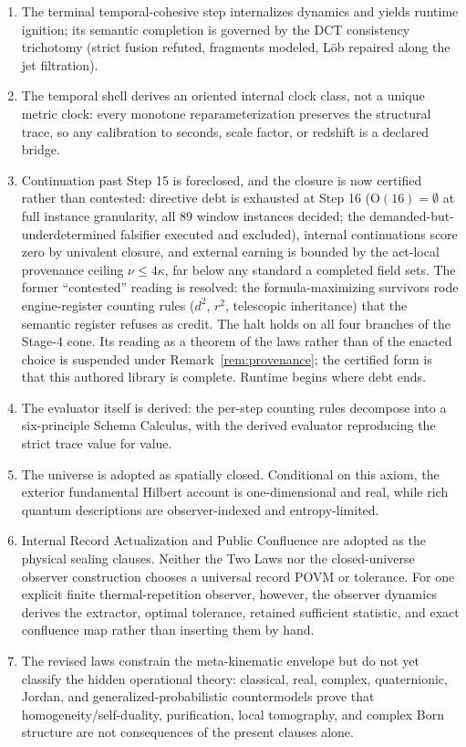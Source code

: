 \documentclass[11pt]{article}
\theoremstyle{plain}
\theoremstyle{definition}
\theoremstyle{remark}
\begin{document}
\begin{enumerate}[leftmargin=*]
\item The terminal temporal-cohesive step internalizes dynamics and yields runtime ignition; its semantic completion is governed by the DCT consistency trichotomy (strict fusion refuted, fragments modeled, L\"ob repaired along the jet filtration).
\item The temporal shell derives an oriented internal clock class, not a unique metric clock: every monotone reparameterization preserves the structural trace, so any calibration to seconds, scale factor, or redshift is a declared bridge.
\item Continuation past Step 15 is foreclosed, and the closure is now certified rather than contested: directive debt is exhausted at Step 16 (\(\mathrm{O}(16)=\emptyset\) at full instance granularity, all 89 window instances decided; the demanded-but-underdetermined falsifier executed and excluded), internal continuations score zero by univalent closure, and external earning is bounded by the act-local provenance ceiling \(\nu\le4\kappa\), far below any standard a completed field sets. The former ``contested'' reading is resolved: the formula-maximizing survivors rode engine-register counting rules (\(d^2\), \(r^2\), telescopic inheritance) that the semantic register refuses as credit. The halt holds on all four branches of the Stage-4 cone. Its reading as a theorem of the laws rather than of the enacted choice is suspended under Remark~\ref{rem:provenance}; the certified form is that this authored library is complete. Runtime begins where debt ends.
\item The evaluator itself is derived: the per-step counting rules decompose into a six-principle Schema Calculus, with the derived evaluator reproducing the strict trace value for value.
\item The universe is adopted as spatially closed. Conditional on this axiom, the exterior fundamental Hilbert account is one-dimensional and real, while rich quantum descriptions are observer-indexed and entropy-limited.
\item Internal Record Actualization and Public Confluence are adopted as the physical sealing clauses. Neither the Two Laws nor the closed-universe observer construction chooses a universal record POVM or tolerance. For one explicit finite thermal-repetition observer, however, the observer dynamics derives the extractor, optimal tolerance, retained sufficient statistic, and exact confluence map rather than inserting them by hand.
\item The revised laws constrain the meta-kinematic envelope but do not yet classify the hidden operational theory: classical, real, complex, quaternionic, Jordan, and generalized-probabilistic countermodels prove that homogeneity/self-duality, purification, local tomography, and complex Born structure are not consequences of the present clauses alone.

\end{enumerate}
\end{document}
